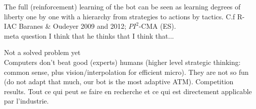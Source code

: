The full (reinforcement) learning of the bot can be seen as learning degrees of liberty one by one with a hierarchy from strategies to actions by tactics. C.f R-IAC Baranes \& Oudeyer 2009 and 2012; $PI^2$-CMA (ES).\\

meta question I think that he thinks that I think that...
\citep{RussellW89}
\citep{metaMCTS}


Not a solved problem yet\\
Computers don't beat good (experts) humans (higher level strategic thinking: common sense, plus vision/interpolation for efficient micro). They are not so fun (do not adapt that much, our bot is the most adaptive ATM). Competition results.
Tout ce qui peut se faire en recherche et ce qui est directement applicable par l'industrie.



